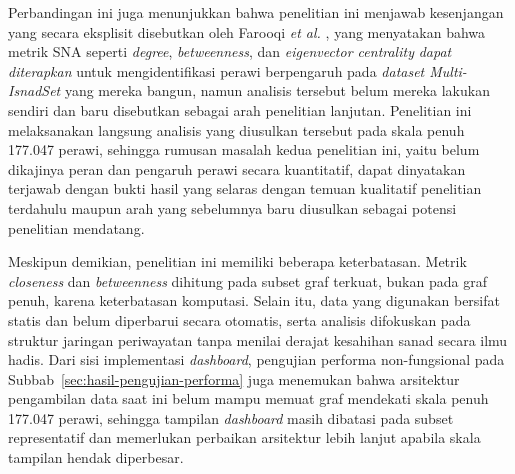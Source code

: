 Perbandingan ini juga menunjukkan bahwa penelitian ini menjawab kesenjangan yang secara eksplisit disebutkan oleh Farooqi \textit{et al.} \cite{FAROOQI2024110439}, yang menyatakan bahwa metrik SNA seperti \textit{degree}, \textit{betweenness}, dan \textit{eigenvector centrality} \textit{dapat diterapkan} untuk mengidentifikasi perawi berpengaruh pada \textit{dataset Multi-IsnadSet} yang mereka bangun, namun analisis tersebut belum mereka lakukan sendiri dan baru disebutkan sebagai arah penelitian lanjutan. Penelitian ini melaksanakan langsung analisis yang diusulkan tersebut pada skala penuh 177.047 perawi, sehingga rumusan masalah kedua penelitian ini, yaitu belum dikajinya peran dan pengaruh perawi secara kuantitatif, dapat dinyatakan terjawab dengan bukti hasil yang selaras dengan temuan kualitatif penelitian terdahulu maupun arah yang sebelumnya baru diusulkan sebagai potensi penelitian mendatang.

Meskipun demikian, penelitian ini memiliki beberapa keterbatasan. Metrik \textit{closeness} dan \textit{betweenness} dihitung pada subset graf terkuat, bukan pada graf penuh, karena keterbatasan komputasi. Selain itu, data yang digunakan bersifat statis dan belum diperbarui secara otomatis, serta analisis difokuskan pada struktur jaringan periwayatan tanpa menilai derajat kesahihan sanad secara ilmu hadis. Dari sisi implementasi \textit{dashboard}, pengujian performa non-fungsional pada Subbab~\ref{sec:hasil-pengujian-performa} juga menemukan bahwa arsitektur pengambilan data saat ini belum mampu memuat graf mendekati skala penuh 177.047 perawi, sehingga tampilan \textit{dashboard} masih dibatasi pada subset representatif dan memerlukan perbaikan arsitektur lebih lanjut apabila skala tampilan hendak diperbesar.
